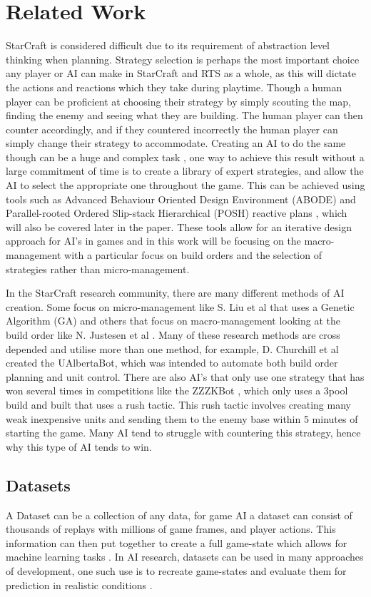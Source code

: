 \documentclass[journal]{IEEEtran}
\begin{document}
\section{Related Work}
StarCraft is considered difficult due to its requirement of abstraction level thinking when planning. Strategy selection is perhaps the most important choice any player or AI can make in StarCraft and RTS as a whole, as this will dictate the actions and reactions which they take during playtime. Though a human player can be proficient at choosing their strategy by simply scouting the map, finding the enemy and seeing what they are building. The human player can then counter accordingly, and if they countered incorrectly the human player can simply change their strategy to accommodate. Creating an AI to do the same though can be a huge and complex task \cite{Fuzzy}\cite{OnlineEvo}\cite{GoalDriven}, one way to achieve this result without a large commitment of time is to create a library of expert strategies, and allow the AI to select the appropriate one throughout the game. This can be achieved using tools such as Advanced Behaviour Oriented Design Environment (ABODE) and Parallel-rooted Ordered Slip-stack Hierarchical (POSH) reactive plans \cite{POSH}, which will also be covered later in the paper. These tools allow for an iterative design approach for AI's in games and in this work will be focusing on the macro-management with a particular focus on build orders and the selection of strategies rather than micro-management. 

In the StarCraft research community, there are many different methods of AI creation. Some focus on micro-management like S. Liu et al \cite{EffectiveMicro} that uses a Genetic Algorithm (GA) and others that focus on macro-management looking at the build order like N. Justesen et al \cite{OnlineEvo}. Many of these research methods are cross depended and utilise more than one method, for example, D. Churchill et al \cite{Agents} created the UAlbertaBot, which was intended to automate both build order planning and unit control. There are also AI's that only use one strategy that has won several times in competitions like the ZZZKBot \cite{ZZZK}\cite{Results}, which only uses a 3pool build and built that uses a rush tactic. This rush tactic involves creating many weak inexpensive units and sending them to the enemy base within 5 minutes of starting the game. Many AI tend to struggle with countering this strategy, hence why this type of AI tends to win.

\subsection{Datasets}
A Dataset can be a collection of any data, for game AI a dataset can consist of thousands of replays with millions of game frames, and player actions\cite{Dataset}. This information can then put together to create a full game-state which allows for machine learning tasks \cite{Dataset17}. In AI research, datasets can be used in many approaches of development, one such use is to recreate game-states and evaluate them for prediction in realistic conditions \cite{SpecialTactics}.
\end{document}
